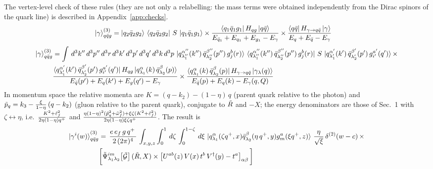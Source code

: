 \documentclass[9pt]{article}
\newcommand{\epsq}{\Tilde{\varepsilon}_{f}}  %
\newcommand{\omq}{\Tilde{\omega}_{f}}        %
\numberwithin{equation}{section}
\begin{document}
\begin{enumerate}
\begin{itemize}
\end{itemize}
The vertex-level check of these rules (they are not only a relabelling: the mass terms were obtained independently from the Dirac spinors of the quark line) is described in Appendix~\ref{app:checks}.
\begin{align}
    \ket{\gamma}^{(3)}_{q\Bar{q}g} & = \ket{q_{2}\Bar{q}_{2}g_{2}}\,\bra{q_{2}\Bar{q}_{2}g_{2}}\,S\,\ket{q_{1}\Bar{q}_{1}g_{1}}\times \frac{\bra{q_{1}\Bar{q}_{1}g_{1}}H_{qg}\ket{q\Bar{q}}}{E_{\Bar{q}_{1}}+E_{q_{1}}+E_{g_{1}}-E_{\gamma}} \times \frac{\bra{q\Bar{q}}H_{\gamma\rightarrow q\Bar{q}}\ket{\gamma}}{E_{q}+E_{\Bar{q}}-E_{\gamma}}
\end{align}
\begin{align}
    \ket{\gamma}^{(3)}_{q\Bar{q}g} & = \int\, d^{3}k''\, d^{3}p''\, d^{3}r\,d^{3}k'\, d^{3}p'\, d^{3}q'\, d^{3}k\, d^{3}p\, \ket{q^{\alpha''}_{\lambda''_{1}}(k'')\,\Bar{q}^{\beta''}_{\lambda''_{2}}(p'')\,g^{b}_{j}(r)}\,\bra{q^{\alpha''}_{\lambda''_{1}}(k'')\,\Bar{q}^{\beta''}_{\lambda''_{2}}(p'')\,g^{b}_{j}(r)}\,S\,\ket{q^{\alpha'}_{\lambda'_{1}}(k')\,\Bar{q}^{\beta'}_{\lambda'_{2}}(p')\,g^{a'}_{i'}(q')}\times\notag \\ & \frac{\bra{q^{\alpha'}_{\lambda'_{1}}(k')\,\Bar{q}^{\beta'}_{\lambda'_{2}}(p')\,g^{a'}_{i'}(q')}H_{qg}\ket{q^{\alpha}_{\lambda_{1}}(k)\,\Bar{q}^{\beta}_{\lambda_{2}}(p)}}{E_{\Bar{q}}(p')+E_{q}(k')+E_{g}(q')-E_{\gamma}} \times \frac{\bra{q^{\alpha}_{\lambda_{1}}(k)\,\Bar{q}^{\beta}_{\lambda_{2}}(p)}H_{\gamma\rightarrow q\Bar{q}}\ket{\gamma_{\lambda}(q)}}{E_{\Bar{q}}(p)+E_{q}(k)-E_{\gamma}(q,Q)}
\end{align}
In momentum space the relative momenta are $K = (q-k_{2})-(1-\eta)\,q$ (parent quark relative to the photon) and $\Tilde{p}_{q} = k_{3}-\frac{\xi}{1-\eta}\,(q-k_{2})$ (gluon relative to the parent quark), conjugate to $\Tilde{R}$ and $-X$; the energy denominators are those of Sec.~1 with $\zeta\leftrightarrow\eta$, i.e.\ $\frac{K^{2}+\epsq^{2}}{2\eta(1-\eta)q^{+}}$ and $\frac{\eta(1-\eta)^{2}(\Tilde{p}_{q}^{2}+\omq^{2})+\xi\zeta(K^{2}+\epsq^{2})}{2\eta(1-\eta)\xi\zeta q^{+}}$. The result is
\begin{align} \label{eq:5}
     \ket{\gamma^{i}(w)}^{(3)}_{q\Bar{q}g} & = \,\frac{e\,e_{f}\,g\,q^{+}\,}{2\,(2\pi)^{4}}\, \int_{x,y,z} \int_{0}^{1}\, d\zeta\, \int_{0}^{1-\zeta}\, d\xi\,\ket{q^{\alpha}_{\lambda_{1}}(\zeta q^{+},x)\Bar{q}^{\beta}_{\lambda_{2}}(\eta\,q^{+},y)g^{a}_{m}(\xi q^{+},z)}\, \frac{\eta}{\sqrt{\xi}}\, \delta^{(2)}(w-c)\,\times \notag \\ & \bigg[\Tilde{\Psi}^{im}_{\lambda_{1}\lambda_{2}}\!\left[\Tilde{\mathcal{G}}\right](\Tilde{R},X)\times \left[U^{ab}(z)\,V(x)\,t^{b}\,V^{\dagger}(y)-t^{a}\right]_{\alpha\beta}\bigg]

\end{align}
\end{enumerate}
\end{document}
